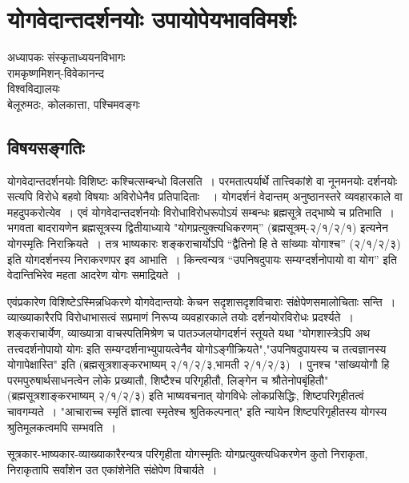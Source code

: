 {\fontsize{15}{17}\selectfont
\presetvalues
\chapter{योगवेदान्तदर्शनयोः  उपायोपेयभावविमर्शः}

\begin{center}
\smallskip

अध्यापकः संस्कृताध्ययनविभागः\\
रामकृष्णमिशन्-विवेकानन्द\\
विश्वविद्यालयः\\
बेलूरुमठः, कोलकात्ता, पश्चिमवङ्गः
\addrule
\end{center}

\section*{विषयसङ्गतिः}

योगवेदान्तदर्शनयोः विशिष्टः कश्चित्सम्बन्धो विलसति~। परमतात्पर्यार्थे तात्त्विकांशे वा नूनमनयोः दर्शनयोः सत्यपि विरोधे बहवो विषयाः अविरोधेनैव प्रतिपादिताः~~। योगदर्शनं वेदान्तम् अनुष्ठानस्तरे व्यवहारकाले वा महदुपकरोत्येव~। एवं योगवेदान्तदर्शनयोः विरोधाविरोधरूपोऽयं सम्बन्धः ब्रह्मसूत्रे तद्भाष्ये च प्रतिभाति~। भगवता बादरायणेन ब्रह्मसूत्रस्य द्वितीयाध्याये "योगप्रत्युक्त्यधिकरणम्” (ब्रह्मसूत्रम्-२/१/२/१) इत्यनेन योगस्मृतिः निराक्रियते~। तत्र भाष्यकारः शङ्कराचार्योऽपि “द्वैतिनो हि ते सांख्याः योगाश्च” (२/१/२/३) इति योगदर्शनस्य निराकरणपर इव आभाति~। किन्त्वन्यत्र “उपनिषदुपायः सम्यग्दर्शनोपायो वा योग” इति वेदान्तिभिरेव महता आदरेण योगः समाद्रियते~। 

एवंप्रकारेण विशिष्टेऽस्मिन्नधिकरणे योगवेदान्तयोः केचन सदृशासदृशविचाराः संक्षेपेणसमालोचिताः सन्ति~। व्याख्याकारैरपि विरोधाभासत्वं सप्रमाणं निरूप्य व्यवहारकाले तयोः दर्शनयोरविरोधः प्रदर्श्यते~। शङ्कराचार्येण, व्याख्यात्रा वाचस्पतिमिश्रेण च पातञ्जलयोगदर्शनं स्तूयते यथा "योगशास्त्रेऽपि अथ तत्त्वदर्शनोपायो योगः इति सम्यग्दर्शनाभ्युपायत्वेनैव योगोऽङ्गीक्रियते","उपनिषदुपायस्य च तत्वज्ञानस्य योगापेक्षास्ति" इति (ब्रह्मसूत्रशाङ्करभाष्यम् २/१/२/३,भामती २/१/२/३)~। पुनश्च "सांख्ययोगौ हि परमपुरुषार्थसाधनत्वेन लोके प्रख्यातौ, शिष्टैश्च परिगृहीतौ, लिङ्गेन च श्रौतेनोपबृंहितौ" (ब्रह्मसूत्रशाङ्करभाष्यम् २/१/२/३) इति भाष्यवचनात् योगविधेः लोकप्रसिद्धिः, शिष्टपरिगृहीतत्वं चावगम्यते~। "आचाराच्च स्मृतिं ज्ञात्वा स्मृतेश्च श्रुतिकल्पनात्" इति न्यायेन शिष्टपरिगृहीतस्य योगस्य श्रुतिमूलकत्वमपि सम्भवति~। 

सूत्रकार-भाष्यकार-व्याख्याकारैरन्यत्र परिगृहीता योगस्मृतिः योगप्रत्युक्त्यधिकरणेन कुतो निराकृता, निराकृतापि सर्वांशेन उत एकांशेनेति संक्षेपेण विचार्यते~। 

}
